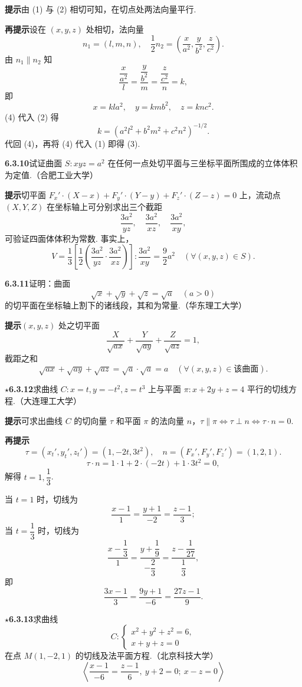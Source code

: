 \documentclass[UTF8,12pt,a4paper,fontset=fandol]{ctexart}
\begin{document}
\noindent\textbf{提示}\quad 由 (1) 与 (2) 相切可知，在切点处两法向量平行.

\noindent\textbf{再提示}\quad 设在 $(x,y,z)$ 处相切，法向量
\[
  n_1=(l,m,n),\quad
  \frac12n_2=\left(\frac{x}{a^2},\frac{y}{b^2},\frac{z}{c^2}\right).
\]
由 $n_1\parallel n_2$ 知
\[
  \frac{\dfrac{x}{a^2}}{l}
  =\frac{\dfrac{y}{b^2}}{m}
  =\frac{\dfrac{z}{c^2}}{n}=k,
\]
即
\[
  x=kla^2,\quad y=kmb^2,\quad z=knc^2. \tag{4}
\]
(4) 代入 (2) 得
\[
  k=(a^2l^2+b^2m^2+c^2n^2)^{-1/2}.
\]
代回 (4)，再将 (4) 代入 (1) 即得 (3).

\noindent\textbf{6.3.10}\quad 试证曲面 $S:xyz=a^2$ 在任何一点处切平面与三坐标平面所围成的立体体积为定值.（合肥工业大学）

\noindent\textbf{提示}\quad 切平面 $F_x'\cdot(X-x)+F_y'\cdot(Y-y)+F_z'\cdot(Z-z)=0$ 上，流动点 $(X,Y,Z)$ 在坐标轴上可分别求出三个截距
\[
  \frac{3a^2}{yz},\quad \frac{3a^2}{xz},\quad \frac{3a^2}{xy},
\]
可验证四面体体积为常数. 事实上，
\[
  V=\frac13\left[\frac12\left(\frac{3a^2}{yz}\cdot\frac{3a^2}{xz}\right)\right]:
  \frac{3a^2}{xy}
  =\frac92a^2\quad(\forall(x,y,z)\in S).
\]

\noindent\textbf{6.3.11}\quad 证明：曲面
\[
  \sqrt{x}+\sqrt{y}+\sqrt{z}=\sqrt{a}\quad(a>0)
\]
的切平面在坐标轴上割下的诸线段，其和为常量.（华东理工大学）

\noindent\textbf{提示}\quad $(x,y,z)$ 处之切平面
\[
  \frac{X}{\sqrt{ax}}+\frac{Y}{\sqrt{ay}}+\frac{Z}{\sqrt{az}}=1,
\]
截距之和
\[
  \sqrt{ax}+\sqrt{ay}+\sqrt{az}
  =\sqrt a\cdot\sqrt a=a\quad(\forall(x,y,z)\in\text{该曲面}).
\]

\noindent\textbf{\ensuremath{\star}6.3.12}\quad 求曲线 $C:x=t,y=-t^2,z=t^3$ 上与平面 $\pi:x+2y+z=4$ 平行的切线方程.（大连理工大学）

\noindent\textbf{提示}\quad 可求出曲线 $C$ 的切向量 $\tau$ 和平面 $\pi$ 的法向量 $n$，$\tau\parallel\pi\Leftrightarrow \tau\perp n\Leftrightarrow \tau\cdot n=0$.

\noindent\textbf{再提示}\quad
\[
  \tau=(x_t',y_t',z_t')=(1,-2t,3t^2),\quad n=(F_x',F_y',F_z')=(1,2,1).
\]
\[
  \tau\cdot n=1\cdot1+2\cdot(-2t)+1\cdot3t^2=0,
\]
解得 $t=1,\dfrac13$.

当 $t=1$ 时，切线为
\[
  \frac{x-1}{1}=\frac{y+1}{-2}=\frac{z-1}{3};
\]
当 $t=\dfrac13$ 时，切线为
\[
  \frac{x-\dfrac13}{1}=\frac{y+\dfrac19}{-\dfrac23}
  =\frac{z-\dfrac1{27}}{\dfrac13},
\]
即
\[
  \frac{3x-1}{3}=\frac{9y+1}{-6}=\frac{27z-1}{9}.
\]

\noindent\textbf{\ensuremath{\star}6.3.13}\quad 求曲线
\[
  C:\begin{cases}
    x^2+y^2+z^2=6,\\
    x+y+z=0
  \end{cases}
\]
在点 $M(1,-2,1)$ 的切线及法平面方程.（北京科技大学）
\[
  \left\langle
  \frac{x-1}{-6}=\frac{z-1}{6},\ y+2=0;\ x-z=0
  \right\rangle
\]
\end{document}
